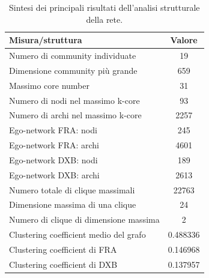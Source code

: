 \begin{table}[H]
\centering
\caption{Sintesi dei principali risultati dell’analisi strutturale della rete.}
\label{tab:structural_summary}
\begin{tabular}{lc}
\toprule
\textbf{Misura/struttura} & \textbf{Valore} \\
\midrule
Numero di community individuate & 19 \\
Dimensione community più grande & 659 \\
Massimo core number & 31 \\
Numero di nodi nel massimo k-core & 93 \\
Numero di archi nel massimo k-core & 2257 \\
Ego-network FRA: nodi & 245 \\
Ego-network FRA: archi & 4601 \\
Ego-network DXB: nodi & 189 \\
Ego-network DXB: archi & 2613 \\
Numero totale di clique massimali & 22763 \\
Dimensione massima di una clique & 24 \\
Numero di clique di dimensione massima & 2 \\
Clustering coefficient medio del grafo & 0.488336 \\
Clustering coefficient di FRA & 0.146968 \\
Clustering coefficient di DXB & 0.137957 \\
\bottomrule
\end{tabular}
\end{table}